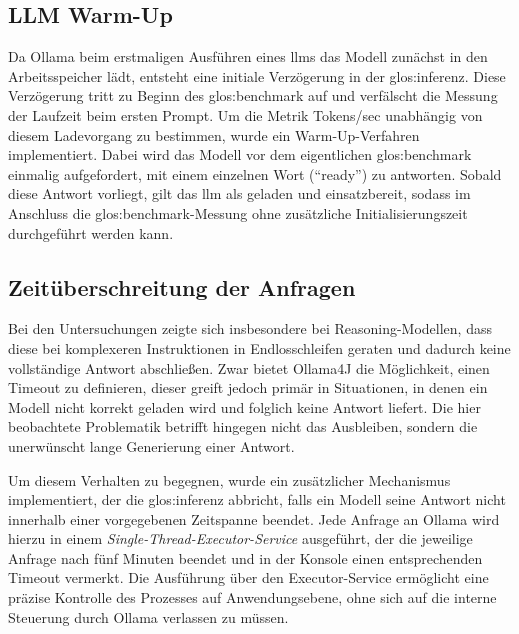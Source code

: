 
\subsection{LLM Warm-Up}\label{subsec:llm-warm-up}

Da Ollama beim erstmaligen Ausführen eines \glspl{llm} das Modell zunächst in den Arbeitsspeicher lädt, entsteht eine initiale Verzögerung in der \gls{glos:inferenz}.
Diese Verzögerung tritt zu Beginn des \gls{glos:benchmark} auf und verfälscht die Messung der Laufzeit beim ersten Prompt.
Um die Metrik Tokens/sec unabhängig von diesem Ladevorgang zu bestimmen, wurde ein Warm-Up-Verfahren implementiert.
Dabei wird das Modell vor dem eigentlichen \gls{glos:benchmark} einmalig aufgefordert, mit einem einzelnen Wort (\enquote{ready}) zu antworten.
Sobald diese Antwort vorliegt, gilt das \gls{llm} als geladen und einsatzbereit, sodass im Anschluss die \gls{glos:benchmark}-Messung ohne zusätzliche Initialisierungszeit durchgeführt werden kann.


\subsection{Zeitüberschreitung der Anfragen}\label{subsec:zeituberschreitung-der-anfragen}

Bei den Untersuchungen zeigte sich insbesondere bei Reasoning-Modellen, dass diese bei komplexeren Instruktionen in Endlosschleifen geraten und dadurch keine vollständige Antwort abschließen.
Zwar bietet Ollama4J die Möglichkeit, einen Timeout zu definieren, dieser greift jedoch primär in Situationen, in denen ein Modell nicht korrekt geladen wird und folglich keine Antwort liefert.
Die hier beobachtete Problematik betrifft hingegen nicht das Ausbleiben, sondern die unerwünscht lange Generierung einer Antwort.

Um diesem Verhalten zu begegnen, wurde ein zusätzlicher Mechanismus implementiert, der die \gls{glos:inferenz} abbricht, falls ein Modell seine Antwort nicht innerhalb einer vorgegebenen Zeitspanne beendet.
Jede Anfrage an Ollama wird hierzu in einem \textit{Single-Thread-Executor-Service} ausgeführt, der die jeweilige Anfrage nach fünf Minuten beendet und in der Konsole einen entsprechenden Timeout vermerkt.
Die Ausführung über den Executor-Service ermöglicht eine präzise Kontrolle des Prozesses auf Anwendungsebene, ohne sich auf die interne Steuerung durch Ollama verlassen zu müssen.

